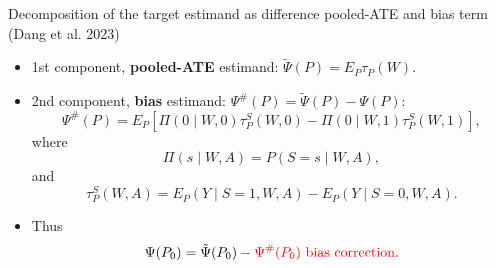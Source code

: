 \documentclass[t]{beamer}
\begin{document}
\begin{frame}{Decomposition of the target estimand as difference  pooled-ATE and bias term (Dang et al. 2023)}

\begin{itemize}
\item 1st component, \textbf{pooled-ATE} estimand: $\tilde{\Psi}(P)=E_P\tau_P(W)$.
\item 2nd component, \textbf{bias} estimand: $\Psi^\#(P)=\tilde{\Psi}(P)-\Psi(P)$:
$$\Psi^\#(P)=E_P[\Pi(0\mid W,0)\tau^S_P(W,0)-\Pi(0\mid W,1)\tau^S_P(W,1)],$$
 where $$\Pi(s\mid W,A)=P(S=s\mid W,A),$$ and \[\tau_P^S(W,A)=E_P(Y\mid S=1,W,A)-E_P(Y\mid S=0,W,A).\]
\item Thus
\[ \Psi(P_0)=\tilde{\Psi}(P_0)-\textcolor{red}{\Psi^\#(P_0)} \ \text{\textcolor{red}{bias correction}}.\]
\end{itemize}
\end{frame}
\end{document}
